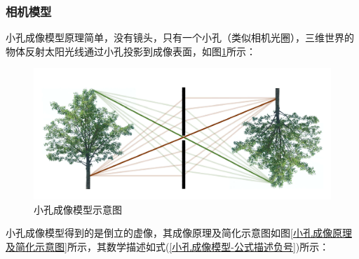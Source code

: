 \documentclass{article}
\begin{document}
\subsubsection{相机模型}
小孔成像模型原理简单，没有镜头，只有一个小孔（类似相机光圈），三维世界的物体反射太阳光线通过小孔投影到成像表面，如图\ref{小孔成像模型}所示：
\begin{figure}[H]
\begin{center}
	\includegraphics[scale=0.3]{小孔成像模型1}
	\caption{小孔成像模型示意图}
	\label{小孔成像模型}
\end{center}
\end{figure}

小孔成像模型得到的是倒立的虚像，其成像原理及简化示意图如图\ref{小孔成像原理及简化示意图}所示，其数学描述如式(\ref{小孔成像模型-公式描述负号})所示：
\end{document}
